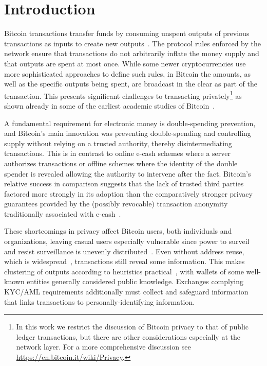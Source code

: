 \documentclass[a4paper]{article}
\begin{document}
\section{Introduction}
Bitcoin transactions transfer funds by consuming unspent outputs of previous transactions as inputs to create new outputs~\cite{nakamoto2009bitcoin}. The protocol rules enforced by the network ensure that transactions do not arbitrarily inflate the money supply and that outputs are spent at most once. While some newer cryptocurrencies use more sophisticated approaches to define such rules, in Bitcoin the amounts, as well as the specific outputs being spent, are broadcast in the clear as part of the transaction. This presents significant challenges to transacting privately\footnote{In this work we restrict the discussion of Bitcoin privacy to that of public ledger transactions, but there are other considerations especially at the network layer. For a more comprehensive discussion see \url{https://en.bitcoin.it/wiki/Privacy}.} as shown already in some of the earliest academic studies of Bitcoin~\cite{reid2013analysis,ron2013quantitative,androulaki2013evaluating,ober2013structure,moeser2013inquiry,meiklejohn2013fistful}.

A fundamental requirement for electronic money is double-spending prevention, and Bitcoin's main innovation was preventing double-spending and controlling supply without relying on a trusted authority, thereby disintermediating transactions. This is in contrast to online e-cash schemes where a server authorizes transactions or offline schemes where the identity of the double spender is revealed allowing the authority to intervene after the fact. Bitcoin's relative success in comparison suggests that the lack of trusted third parties factored more strongly in its adoption than the comparatively stronger privacy guarantees provided by the (possibly revocable) transaction  anonymity traditionally associated with e-cash~\cite{davida1997anonymity}.

These shortcomings in privacy affect Bitcoin users, both individuals and organizations, leaving casual users especially vulnerable since power to surveil and resist surveillance is unevenly distributed~\cite{rogaway2015moral}. Even without address reuse, which is widespread~\cite{gaihre2018bitcoin}, transactions still reveal some information. This makes clustering of outputs according to heuristics practical~\cite{harrigan2016unreasonable}, with wallets of some well-known entities generally considered public knowledge. Exchanges complying KYC/AML requirements additionally must collect and safeguard information that links transactions to personally-identifying information.
\end{document}
